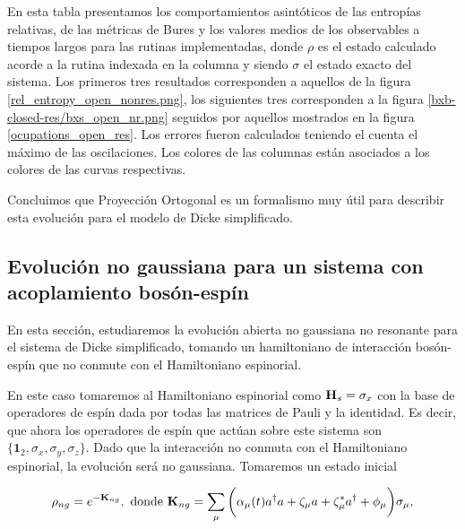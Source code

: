 \documentclass{report} %
\numberwithin{equation}{section}
\begin{document}
\begin{table}
    \begin{tablenotes}
      \small
      \item En esta tabla presentamos los comportamientos asintóticos de las entropías relativas, de las métricas de Bures y los valores medios de los observables a tiempos largos para las rutinas implementadas, donde $\rho$ es el estado calculado acorde a la rutina indexada en la columna y siendo $\sigma$ el estado exacto del sistema. Los primeros tres resultados corresponden a aquellos de la figura \ref{rel_entropy_open_nonres.png}, los siguientes tres corresponden a la figura \ref{bxb-closed-res/bxs_open_nr.png} seguidos por aquellos mostrados en la figura \ref{ocupations_open_res}. Los errores fueron calculados teniendo el cuenta el máximo de las oscilaciones. Los colores de las columnas están asociados a los colores de las curvas respectivas. 
    \end{tablenotes}
    \label{table4}
\end{table}

Concluimos que Proyección Ortogonal es un formalismo muy útil para describir esta evolución para el modelo de Dicke simplificado. 

\subsection{Evoluci\'on no gaussiana para un sistema con acoplamiento bos\'on-esp\'in}
\label{dicke_non-gaussian}

En esta sección, estudiaremos la evolución abierta no gaussiana no resonante para el sistema de Dicke simplificado, tomando un hamiltoniano de interacción bosón-espín que no conmute con el Hamiltoniano espinorial.

En este caso tomaremos al Hamiltoniano espinorial como ${\bf H}_s = \sigma_x$ con la base de operadores de espín dada por todas las matrices de Pauli y la identidad. Es decir, que ahora los operadores de espín que actúan sobre este sistema son $\{\mathbf{1}_2, \sigma_x, \sigma_y, \sigma_z\}$. Dado que la interacción no conmuta con el Hamiltoniano espinorial, la evolución será no gaussiana. Tomaremos un estado inicial

\begin{equation}
    \rho_{ng}= e^{-\mathbf{K}_{ng}}, \textnormal { donde } \mathbf{K}_{ng} = \sum_{\mu} \bigg(\alpha_{\mu}(t)a^{\dagger}a + \zeta_{\mu}a + \zeta_{\mu}^{*}a^{\dagger} + \phi_{\mu}\bigg) \sigma_{\mu},
    \label{model3.7_rho}
\end{equation}
\end{document}
